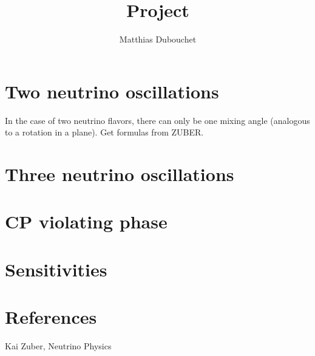 \documentclass[10pt, a4paper]{article}
\title{Project}
\author{Matthias Dubouchet}
\date{}
\begin{document}
\maketitle
\section{Two neutrino oscillations}
In the case of two neutrino flavors, there can only be one mixing angle (analogous to a rotation in a plane). Get formulas from ZUBER.

\section{Three neutrino oscillations}

\section{CP violating phase}

\section{Sensitivities}

\section{References}
Kai Zuber, Neutrino Physics
\end{document}
